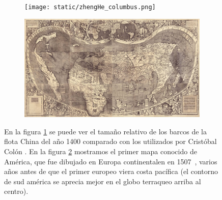 \documentclass[a4paper,10pt]{book}
\newif\ifes
\newcommand{\es}[1]{\ifes#1\fi}
\begin{document}
%

\es{Quizás el centro más avanzado en términos científicos y tecnologías haya sido la región de China~\cite{needham2004-generalConclusionsAndReflections}.}%
%
\es{China fue desde por lo menos el siglo segundo antes de cristo el centro del mundo productivo del mundo, de donde los Romanos se abastec\'ian de seda.}%
%
\es{Desarrolla el acero en el siglo segundo, el papel en el siglo sexto, la imprenta en el siglo octavo, el papel moneda en el noveno, la br\'ujula en el onceavo.}%
%
\es{Para el año 1400, China llevaba al menos 2000 de continuidad socio-pol\'itica, y 900 a\~nos de un estado meritocr\'atico, en el cual sus miembros eran elegidos a trav\'es de un examen imperial.}%
%
\es{China era una región autónoma y autosuficiente, impulsora de innovaciones.}%
%
\es{Es así como China si bien desarrolla una de las flotas más increibles de la Historia durante el 1400, luego de la serie de expediciones de Zheng He (1405-1433) el Gobierno Chino decide cerrarse fronteras adentro y dándolas por finalizadas definitivamente.}%
%
\es{No parecían necesitar nada afuera de sus fronteras.}%
\begin{figure}[ht!]     
  \centering 
  \begin{subfigure}[b]{0.35\textwidth}
    \texttt{[image: static/zhengHe\_columbus.png]} 
    \caption{}
    \label{fig:zhengHe_columbus}
  \end{subfigure}
  \begin{subfigure}[b]{0.5\textwidth}
    \includegraphics[width=\textwidth]{static/mapaWaldseemuller.jpg} 
    \caption{}
    \label{fig:mapaWaldseemuller}
  \end{subfigure}
  \caption{
  En la figura \ref{fig:zhengHe_columbus} se puede ver el tama\~no relativo de los barcos de la flota China del a\~no 1400 comparado con los utilizados por Cristóbal Col\'on \cite{pomeranz2000-divergence}.
  En la figura \ref{fig:mapaWaldseemuller} mostramos el primer mapa conocido de América, que fue dibujado en Europa continentalen en 1507~\cite{waldseemuller1959-universalisCosmographia}, varios años antes de que el primer europeo viera costa pacífica (el contorno de sud américa se aprecia mejor en el globo terraqueo arriba al centro).
  }
  \label{zhengHe_columbus}
\end{figure}
\end{document}
